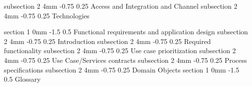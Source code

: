 \documentclass[12pt]{article}
\makeatletter
\renewcommand{\section}{\@startsection
   {section}%
   {1}%
   {0mm}%
   {-1.5\baselineskip}%
   {0.5\baselineskip}%
   {\sffamily\bfseries\upshape\normalsize}}%
\renewcommand{\subsection}{\@startsection
   {subsection}%
   {2}%
   {4mm}%
   {-0.75\baselineskip}%
   {0.25\baselineskip}%
   {\rmfamily\normalfont\scshape\normalsize}}%
\makeatother
\begin{document}
                    \subsection{Access and Integration and Channel }
					\subsection{Technologies}
                    
                \section{Functional requirements and application design}
                    \subsection{Introduction}
                    \subsection{Required functionality}
                    \subsection{Use case prioritization}
                    \subsection{Use Case/Services contracts}
                    \subsection{Process specifications}
                    \subsection{Domain Objects}
               \section{Glossary}
             
\end{document}
